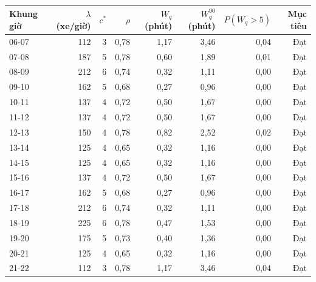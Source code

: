 \begin{tabular}{lrrrrrrr}
\toprule
\textbf{Khung giờ} & \textbf{$\lambda$ (xe/giờ)} & \textbf{$c^*$} & \textbf{$\rho$} & \textbf{$W_q$ (phút)} & \textbf{$W_q^{90}$ (phút)} & \textbf{$P(W_q{>}5)$} & \textbf{Mục tiêu} \\
\midrule
06-07 & 112 & 3 & 0{,}78 & 1{,}17 & 3{,}46 & 0{,}04 & Đạt \\
07-08 & 187 & 5 & 0{,}78 & 0{,}60 & 1{,}89 & 0{,}01 & Đạt \\
08-09 & 212 & 6 & 0{,}74 & 0{,}32 & 1{,}11 & 0{,}00 & Đạt \\
09-10 & 162 & 5 & 0{,}68 & 0{,}27 & 0{,}96 & 0{,}00 & Đạt \\
10-11 & 137 & 4 & 0{,}72 & 0{,}50 & 1{,}67 & 0{,}00 & Đạt \\
11-12 & 137 & 4 & 0{,}72 & 0{,}50 & 1{,}67 & 0{,}00 & Đạt \\
12-13 & 150 & 4 & 0{,}78 & 0{,}82 & 2{,}52 & 0{,}02 & Đạt \\
13-14 & 125 & 4 & 0{,}65 & 0{,}32 & 1{,}16 & 0{,}00 & Đạt \\
14-15 & 125 & 4 & 0{,}65 & 0{,}32 & 1{,}16 & 0{,}00 & Đạt \\
15-16 & 137 & 4 & 0{,}72 & 0{,}50 & 1{,}67 & 0{,}00 & Đạt \\
16-17 & 162 & 5 & 0{,}68 & 0{,}27 & 0{,}96 & 0{,}00 & Đạt \\
17-18 & 212 & 6 & 0{,}74 & 0{,}32 & 1{,}11 & 0{,}00 & Đạt \\
18-19 & 225 & 6 & 0{,}78 & 0{,}47 & 1{,}53 & 0{,}00 & Đạt \\
19-20 & 175 & 5 & 0{,}73 & 0{,}40 & 1{,}36 & 0{,}00 & Đạt \\
20-21 & 125 & 4 & 0{,}65 & 0{,}32 & 1{,}16 & 0{,}00 & Đạt \\
21-22 & 112 & 3 & 0{,}78 & 1{,}17 & 3{,}46 & 0{,}04 & Đạt \\
\bottomrule
\end{tabular}
